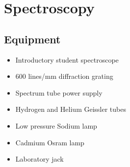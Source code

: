 




\chapter{Spectroscopy}

\section{Equipment}

\begin{minipage}[t]{0.6\textwidth}
\begin{itemize}[noitemsep]
\item Introductory student spectroscope
\item 600 lines/mm diffraction grating
\item Spectrum tube power supply
\item Hydrogen and Helium Geissler tubes 
\end{itemize}
\end{minipage}
\begin{minipage}[t]{0.4\textwidth}
\begin{itemize}[noitemsep]
\item Low pressure Sodium lamp
\item Cadmium Osram lamp
\item Laboratory jack
\end{itemize}
\end{minipage}

